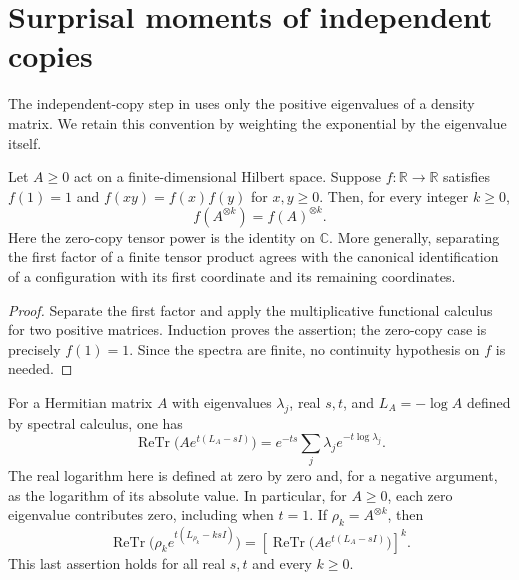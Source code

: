 \section{Surprisal moments of independent copies}
\label{sec:schur-label-iid-moments}

The independent-copy step in
\cite[Section~7, lines~75--85 and 227--238]{OpenAI2026AreaLaw}
uses only the positive eigenvalues of a density matrix. We retain this
convention by weighting the exponential by the eigenvalue itself.

\begin{lemma}
\label{lem:cfc-finite-tensor-power}
\leanok
Let $A\ge0$ act on a finite-dimensional Hilbert space. Suppose
$f:\mathbb R\to\mathbb R$ satisfies $f(1)=1$ and
$f(xy)=f(x)f(y)$ for $x,y\ge0$. Then, for every integer $k\ge0$,
\[
 f(A^{\otimes k})=f(A)^{\otimes k}.
\]
Here the zero-copy tensor power is the identity on $\mathbb C$.
More generally, separating the first factor of a finite tensor product
agrees with the canonical identification of a configuration with its
first coordinate and its remaining coordinates.
\end{lemma}

\begin{proof}
\leanok
Separate the first factor and apply the multiplicative functional calculus
for two positive matrices. Induction proves the assertion; the zero-copy
case is precisely $f(1)=1$. Since the spectra are finite, no continuity
hypothesis on $f$ is needed.
\end{proof}

\begin{lemma}
\label{lem:schur-label-iid-moment-identity}
\leanok
For a Hermitian matrix $A$ with eigenvalues $\lambda_j$, real $s,t$, and
$L_A=-\log A$ defined by spectral calculus, one has
\[
 \operatorname{ReTr}\bigl(Ae^{t(L_A-sI)}\bigr)
 =e^{-ts}\sum_j\lambda_j e^{-t\log\lambda_j}.
\]
The real logarithm here is defined at zero by zero and, for a negative
argument, as the logarithm of its absolute value. In particular, for
$A\ge0$, each zero eigenvalue contributes zero, including when $t=1$.
If $\rho_k=A^{\otimes k}$, then
\[
 \operatorname{ReTr}\bigl(\rho_k e^{t(L_{\rho_k}-ksI)}\bigr)
 =\left[\operatorname{ReTr}\bigl(Ae^{t(L_A-sI)}\bigr)\right]^k.
\]
This last assertion holds for all real $s,t$ and every $k\ge0$.
\end{lemma}

